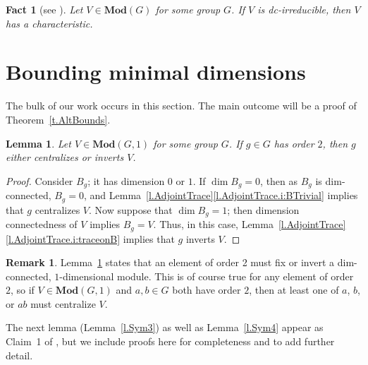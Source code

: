 \documentclass[a4paper, 11pt]{amsart}
\theoremstyle{plain}
\newtheorem{lemma}[theorem]{Lemma}
\newtheorem{fact}[theorem]{Fact}
\theoremstyle{definition}
\newtheorem{remark}[theorem]{Remark}
\theoremstyle{remark}
\newcommand{\Mod}{\mathbf{Mod}}
\begin{document}
\begin{fact}[{see \cite[Characteristic Lemma]{CDW23}}]\label{fact.Characteristic}
Let $V\in \Mod(G)$ for some group $G$. If $V$ is dc-irreducible, then $V$ has a characteristic.
\end{fact}






\section{Bounding minimal dimensions}

The bulk of our work occurs in this section. The main outcome will be a proof of Theorem~\ref{t.AltBounds}.

\begin{lemma}\label{l.Sym2}
Let $V\in \Mod(G,1)$ for some group $G$. If $g \in G$ has order $2$, then $g$ either centralizes or inverts $V$.
\end{lemma}
\begin{proof}
Consider $B_g$; it has dimension $0$ or $1$. If $\dim B_g = 0$, then as $B_g$ is dim-connected, $B_g = 0$, and  Lemma~\ref{l.AdjointTrace}\eqref{l.AdjointTrace.i:BTrivial} implies that $g$ centralizes $V$.  Now suppose that $\dim B_g= 1$; then dimension connectedness of $V$ implies $B_g=V$. Thus, in this case, Lemma~\ref{l.AdjointTrace}\eqref{l.AdjointTrace.i:traceonB} implies that $g$ inverts $V$.
\end{proof}

\begin{remark}\label{r.dimension1}
Lemma~\ref{l.Sym2} states that an element of order 2 must fix or invert a dim-connected, $1$-dimensional module. This is of course true for any element of order $2$, so if  $V\in \Mod(G,1)$ and $a,b\in G$ both have order $2$, then at least one of $a$, $b$, or $ab$ must centralize $V$.
\end{remark}

The next lemma (Lemma~\ref{l.Sym3}) as well as Lemma~\ref{l.Sym4} appear as  Claim~1 of \cite[First Geometrisation Lemma]{CDW23}, but we include proofs here for completeness and to add further detail. 
\end{document}

